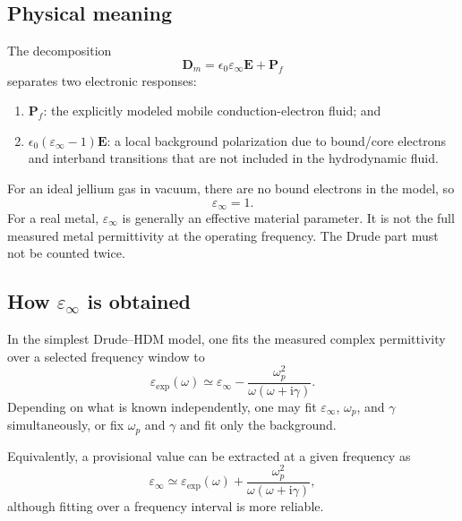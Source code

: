\documentclass[11pt,a4paper]{article}
\newcommand{\E}{\mathbf E}
\newcommand{\Dfield}{\mathbf D}
\newcommand{\Pfield}{\mathbf P}
\newcommand{\ii}{\mathrm i}
\newcommand{\eps}{\varepsilon}
\newcommand{\epsinf}{\varepsilon_\infty}
\newcommand{\omegap}{\omega_p}
\begin{document}
\subsection{Physical meaning}

The decomposition
\begin{equation}
    \Dfield_m=\epsilon_0\epsinf\E+\Pfield_f
    \label{eq:epsinf-decomposition}
\end{equation}
separates two electronic responses:
\begin{enumerate}
    \item \(\Pfield_f\): the explicitly modeled mobile conduction-electron
    fluid; and
    \item \(\epsilon_0(\epsinf-1)\E\): a local background polarization due
    to bound/core electrons and interband transitions that are not included in
    the hydrodynamic fluid.
\end{enumerate}

For an ideal jellium gas in vacuum, there are no bound electrons in the model,
so
\begin{equation}
    \epsinf=1.
    \label{eq:jellium-epsinf}
\end{equation}
For a real metal, \(\epsinf\) is generally an effective material parameter.
It is not the full measured metal permittivity at the operating frequency.
The Drude part must not be counted twice.

\subsection{How \texorpdfstring{$\epsinf$}{epsilon-infinity} is obtained}

In the simplest Drude--HDM model, one fits the measured complex permittivity
over a selected frequency window to
\begin{equation}
    \eps_{\mathrm{exp}}(\omega)
    \simeq
    \epsinf-
    \frac{\omegap^2}{\omega(\omega+\ii\gamma)}.
    \label{eq:epsinf-fit}
\end{equation}
Depending on what is known independently, one may fit \(\epsinf\),
\(\omegap\), and \(\gamma\) simultaneously, or fix \(\omegap\) and
\(\gamma\) and fit only the background.

Equivalently, a provisional value can be extracted at a given frequency as
\begin{equation}
    \epsinf
    \simeq
    \eps_{\mathrm{exp}}(\omega)
    +\frac{\omegap^2}{\omega(\omega+\ii\gamma)},
    \label{eq:epsinf-extraction}
\end{equation}
although fitting over a frequency interval is more reliable.
\end{document}
